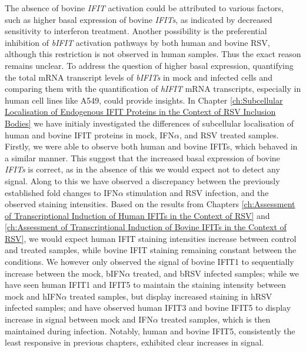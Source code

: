 The absence of bovine \textit{IFIT} activation could be attributed to various factors, such as higher basal expression of bovine \textit{IFITs}, as indicated by decreased sensitivity to interferon treatment. Another possibility is the preferential inhibition of \textit{bIFIT} activation pathways by both human and bovine RSV, although this restriction is not observed in human samples. Thus the exact reason remains unclear. To address the question of higher basal expression, quantifying the total mRNA transcript levels of \textit{bIFITs} in mock and infected cells and comparing them with the quantification of \textit{hIFIT} mRNA transcripts, especially in human cell lines like A549, could provide insights. In Chapter \ref{ch:Subcellular Localisation of Endogenous IFIT Proteins in the Context of RSV Inclusion Bodies} we have initialy investigated the differences of subcellular localisation of human and bovine IFIT proteins in mock, IFN$\alpha$, and RSV treated samples. Firstly, we were able to observe both human and bovine IFITs, which behaved in a similar manner. This suggest that the increased basal expression of bovine \textit{IFITs} is correct, as in the absence of this we would expect not to detect any signal. Along to this we have observed a discrepancy between the previously established fold changes to IFN$\alpha$ stimulation and RSV infection, and the observed staining intensities. Based on the results from Chapters \ref{ch:Assessment of Transcriptional Induction of Human IFITs in the Context of RSV} and \ref{ch:Assessment of Transcriptional Induction of Bovine IFITs in the Context of RSV}, we would expect human IFIT staining intensities increase between control and treated samples, while bovine IFIT staining remaining constant between the conditions. We however only observed the signal of bovine IFIT1 to sequentially increase between the mock, bIFN$\alpha$ treated, and bRSV infected samples; while we have seen human IFIT1 and IFIT5 to maintain the staining intensity between mock and hIFN$\alpha$ treated samples, but display increased staining in hRSV infected samples; and have observed human IFIT3 and bovine IFIT5 to display increase in signal between mock and IFN$\alpha$ treated samples, which is then maintained during infection. Notably, human and bovine IFIT5, consistently the least responsive in previous chapters, exhibited clear increases in signal. 

